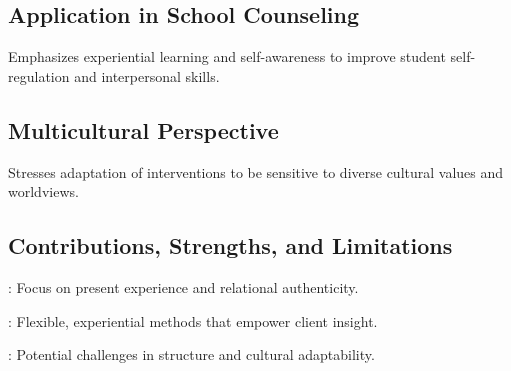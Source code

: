 \subsection{Application in School Counseling}
\begin{coloredlist}
    \item Emphasizes experiential learning and self-awareness to improve student self-regulation and interpersonal skills.
\end{coloredlist}

\subsection{Multicultural Perspective}
\begin{coloredlist}
    \item Stresses adaptation of interventions to be sensitive to diverse cultural values and worldviews.
\end{coloredlist}

\subsection{Contributions, Strengths, and Limitations}
\begin{coloredlist}
    \item {}: Focus on present experience and relational authenticity.
    \item {}: Flexible, experiential methods that empower client insight.
    \item {}: Potential challenges in structure and cultural adaptability.
\end{coloredlist}